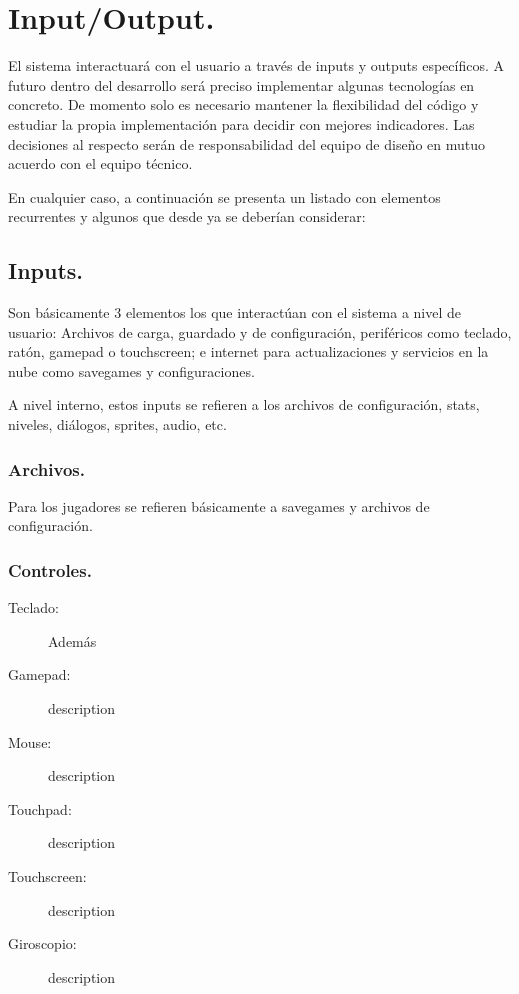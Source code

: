 
\section{Input/Output.}\label{io:input-output}


El sistema interactuará con el usuario a través de inputs y outputs específicos. A futuro dentro del desarrollo será preciso implementar algunas tecnologías en concreto. De momento solo es necesario mantener la flexibilidad del código y estudiar la propia implementación para decidir con mejores indicadores. Las decisiones al respecto serán de responsabilidad del equipo de diseño en mutuo acuerdo con el equipo técnico.

En cualquier caso, a continuación se presenta un listado con elementos recurrentes y algunos que desde ya se deberían considerar:

\subsection{Inputs.}
Son básicamente 3 elementos los que interactúan con el sistema a nivel de usuario: Archivos de carga, guardado y de configuración, periféricos como teclado, ratón, gamepad o touchscreen; e internet para actualizaciones y servicios en la nube como savegames y configuraciones.

A nivel interno, estos inputs se refieren a los archivos de configuración, stats, niveles, diálogos, sprites, audio, etc.

\subsubsection{Archivos.}


Para los jugadores se refieren básicamente a savegames y archivos de configuración.

\subsubsection{Controles.}
\begin{description}
\item[Teclado:] Además

\item[Gamepad:] description

\item[Mouse:] description

\item[Touchpad:] description

\item[Touchscreen:] description

\item[Giroscopio:] description

\end{description}

